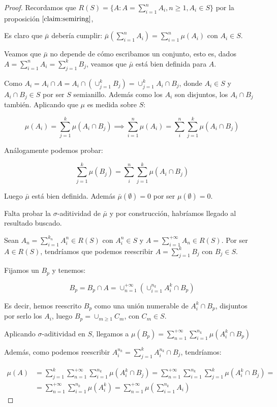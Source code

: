 \begin{proof}
 Recordamos que $R(S) = \{A: A=\sum_{i=1}^n A_i, n\ge 1, A_i \in S\}$ por la proposición $\ref{claim:semiring}$,
 
 Es claro que $\bar{\mu}$ debería cumplir: $\bar{\mu}(\sum_{i=1}^n A_i) = \sum_{i=1}^n \mu(A_i)$ con $A_i \in S$.
 
 Veamos que $\bar{\mu}$ no depende de cómo escribamos un conjunto, esto es, dados $A = \sum_{i=1}^n A_i = \sum_{j=1}^k B_j$,
 veamos que $\bar{\mu}$ está bien definida para $A$.
 
 Como $A_i = A_i \cap A = A_i \cap \left(\cup_{j=1}^k B_j\right) = \cup_{j=1}^k A_i \cap B_j$, donde $A_i \in S$ y
 $A_i \cap B_j \in S$ por ser $S$ semianillo. Además como los $A_i$ son disjuntos, los $A_i\cap B_j$ también.
 Aplicando que $\mu$ es medida sobre $S$:
 
 \[\mu(A_i) = \sum_{j=1}^k \mu(A_i \cap B_j) \implies \sum_{i=1}^n \mu(A_i) = \sum_{i}^n \sum_{j=1}^k \mu(A_i \cap B_j)\]
 
 Análogamente podemos probar:
 
 \[\sum_{j=1}^k \mu(B_j) = \sum_{i}^n \sum_{j=1}^k \mu(A_i \cap B_j)\]
 
 Luego $\bar{\mu}$ está bien definida. Además $\bar{\mu} (\emptyset) = 0$ por ser $\mu(\emptyset) = 0$.
 
 Falta probar la $\sigma$-aditividad de $\bar{\mu}$ y por construcción, habríamos llegado al resultado buscado.
 
 Sean $A_n = \sum_{i=1}^{k_n} A_i^n \in R(S)$ con $A_i^n \in S$ y $A = \sum_{i=1}^{+\infty} A_n \in R(S)$. 
 Por ser $A \in R(S)$, tendríamos que podemos reescribir $A = \sum_{j=1}^k B_j$ con $B_j \in S$.
 
 Fijamos un $B_p$ y tenemos:
 
 \[B_p = B_p \cap A = \cup_{n=1}^{+\infty} \left(\cup_{i=1}^{n_k} A_i^k \cap B_p\right)\]
 
 Es decir, hemos reescrito $B_p$ como una unión numerable de $A_i^k \cap B_p$, disjuntos por serlo los $A_i$, 
 luego $B_p = \cup_{m\ge 1} C_m$, con $C_m \in S$.
 
 Aplicando $\sigma$-aditividad en $S$, llegamos a $\mu(B_p) = \sum_{n=1}^{+\infty} \sum_{i=1}^{n_k} \mu(A_i^k \cap B_p)$
 
 Además, como podemos reescribir $A_i^{n_k} = \sum_{j=1}^k A_i^{n_k} \cap B_j$, tendríamos:
 
 \begin{align*}
 \mu(A) &= \sum_{j=1}^k \sum_{n=1}^{+\infty} \sum_{i=1}^{n_k} \mu(A_i^k \cap B_j) = 
           \sum_{n=1}^{+\infty} \sum_{i=1}^{n_k} \sum_{j=1}^k \mu(A_i^k \cap B_j) = \\
        &= \sum_{n=1}^{+\infty} \sum_{i=1}^{n_k} \mu(A_i^k) =
           \sum_{n=1}^{+\infty} \mu \left(\sum_{i=1}^{n_k} A_i \right)
 \end{align*}
\end{proof}

